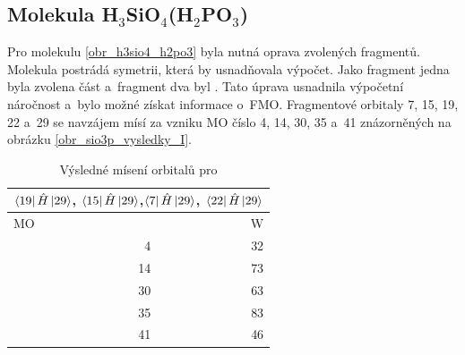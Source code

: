 \documentclass[
  printed, %
  table,   %
  lof,     %
  lot,     %
  oneside,
]{fithesis3}
\begin{document}
 \subsection{Molekula H$_3$SiO$_4$(H$_2$PO$_3$)}
 Pro molekulu \ref{obr_h3sio4_h2po3} byla nutná oprava zvolených fragmentů. Molekula postrádá symetrii, která by usnadňovala výpočet. Jako fragment jedna byla zvolena část  a~fragment dva byl . Tato úprava usnadnila výpočetní náročnost a~bylo možné získat informace o~FMO. Fragmentové orbitaly  7, 15, 19, 22 a~29 se navzájem mísí za vzniku MO číslo 4, 14, 30, 35 a~41 znázorněných na obrázku \ref{obr_sio3p_vysledky_I}.   

\begin{figure}
\begin{center}
\label{obr_SiOH3OH2PO)_vysledky_I}
\end{center}
\end{figure}

\begin{table}[htbp]
\caption{Výsledné mísení orbitalů pro }
\begin{center}
\begin{tabular}{|r|r|}
\hline
\multicolumn{2}{|c|}{$\bra{19}{\hat{H}}\ket{29}$, $\bra{15}{\hat{H}}\ket{29}$,$\bra{7}{\hat{H}}\ket{29}$, $\bra{22}{\hat{H}}\ket{29}$} \\
\hline \hline
\multicolumn{1}{|l|}{MO} & \multicolumn{1}{r|}{W} \\ \hline
4 & 32 \\ \hline
14 & 73 \\ \hline
30 & 63 \\ \hline
35 & 83 \\ \hline
41 & 46 \\ \hline
\end{tabular}

\label{tab_sio3_vysledky}\end{center}
\end{table}
\end{document}
